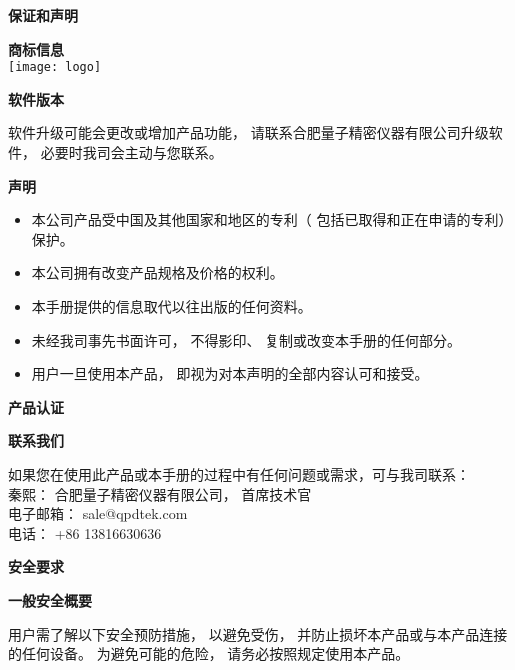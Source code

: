 \newpage

\pagestyle{empty}
\xiaoer \textbf{保证和声明}
\vspace{0.7cm}

\xiaosi \textbf{商标信息}\\
\hspace{8cm}
\hspace{-9.6cm}\texttt{[image: logo]}

\vspace{0.4cm}
\xiaosi\textbf{软件版本}

\song 软件升级可能会更改或增加产品功能， 请联系合肥量子精密仪器有限公司升级软件， 必要时我司会主动与您联系。

\vspace{0.4cm}
\xiaosi\textbf{声明}
\song
\begin{itemize}
 \item 本公司产品受中国及其他国家和地区的专利（ 包括已取得和正在申请的专利）保护。
 \item 本公司拥有改变产品规格及价格的权利。
 \item 本手册提供的信息取代以往出版的任何资料。
 \item 未经我司事先书面许可， 不得影印、 复制或改变本手册的任何部分。
 \item 用户一旦使用本产品， 即视为对本声明的全部内容认可和接受。
\end{itemize}

\vspace{0.4cm}
\xiaosi\textbf{产品认证}
\vspace{3cm}

\xiaosi\textbf{联系我们}

\noindent\song
如果您在使用此产品或本手册的过程中有任何问题或需求，可与我司联系：\\
秦熙： 合肥量子精密仪器有限公司， 首席技术官\\
电子邮箱： sale@qpdtek.com\\
电话： +86 13816630636

\newpage
\xiaoer \textbf{安全要求}
\vspace{1.1cm}

\noindent\sanhao\textbf{一般安全概要}
\vspace{0.7cm}
\song

用户需了解以下安全预防措施， 以避免受伤， 并防止损坏本产品或与本产品连接的任何设备。 为避免可能的危险， 请务必按照规定使用本产品。

